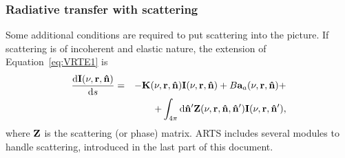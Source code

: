 \subsubsection{Radiative transfer with scattering}
%
Some additional conditions are required to put scattering into the picture. If
scattering is of incoherent and elastic nature, the extension of 
Equation~\ref{eq:VRTE1} is
\begin{eqnarray}
  \label{eq:VRTE2}
  \frac {\mathrm{d}{\bf I}(\nu,{\bf r},{\bf \hat{n}})}{\mathrm{d} s} &=&
    -{\bf K}(\nu,{\bf r},{\bf \hat{n}}) {\bf I}(\nu,{\bf r},{\bf \hat{n}}) +
     B{\bf a}_{a}(\nu,{\bf r},{\bf \hat{n}}) + \\ \nonumber
    &&+ \int_{4\pi} \mathrm{d}{\bf \hat{n}}' {\bf Z}(\nu,{\bf r},{\bf \hat{n}},{\bf \hat{n}}')
    {\bf I}(\nu,{\bf r},{\bf \hat{n}}'),
\end{eqnarray}
where ${\bf Z}$ is the scattering (or phase) matrix.  ARTS includes several
modules to handle scattering, introduced in the last part of this document.\\





%
%
